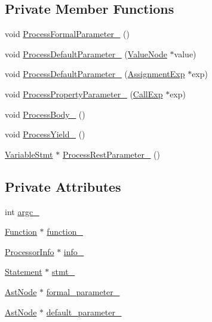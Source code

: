 \subsection*{Private Member Functions}
\begin{DoxyCompactItemize}
\item 
void \hyperlink{classmocha_1_1_function_processor_abf51bbfb82b2118f674091294af28dfa}{ProcessFormalParameter\_\-} ()
\item 
void \hyperlink{classmocha_1_1_function_processor_a3ca564f1c27aac6586fa9876a20c954a}{ProcessDefaultParameter\_\-} (\hyperlink{classmocha_1_1_value_node}{ValueNode} $\ast$value)
\item 
void \hyperlink{classmocha_1_1_function_processor_adfb4453236c5d1880702c41e654cadbc}{ProcessDefaultParameter\_\-} (\hyperlink{classmocha_1_1_assignment_exp}{AssignmentExp} $\ast$exp)
\item 
void \hyperlink{classmocha_1_1_function_processor_aaaecef01492133780ee3d913c3993395}{ProcessPropertyParameter\_\-} (\hyperlink{classmocha_1_1_call_exp}{CallExp} $\ast$exp)
\item 
void \hyperlink{classmocha_1_1_function_processor_aad3b65103cff5f6692654fe79e591bc3}{ProcessBody\_\-} ()
\item 
void \hyperlink{classmocha_1_1_function_processor_a6d6275f740f30823d9989ab10bd5c921}{ProcessYield\_\-} ()
\item 
\hyperlink{classmocha_1_1_variable_stmt}{VariableStmt} $\ast$ \hyperlink{classmocha_1_1_function_processor_a947c36d1350aa2bf1fa13c3f3f90bbd8}{ProcessRestParameter\_\-} ()
\end{DoxyCompactItemize}
\subsection*{Private Attributes}
\begin{DoxyCompactItemize}
\item 
int \hyperlink{classmocha_1_1_function_processor_add1888aa27daa30db055b3ae56835466}{argc\_\-}
\item 
\hyperlink{classmocha_1_1_function}{Function} $\ast$ \hyperlink{classmocha_1_1_function_processor_a6960880e27df165e26343346ffdebd87}{function\_\-}
\item 
\hyperlink{classmocha_1_1_processor_info}{ProcessorInfo} $\ast$ \hyperlink{classmocha_1_1_function_processor_a6f7c00d60191f92a3bdb359c7031eedb}{info\_\-}
\item 
\hyperlink{classmocha_1_1_statement}{Statement} $\ast$ \hyperlink{classmocha_1_1_function_processor_ab5123d2edc85be3e181a79dd7714ba7a}{stmt\_\-}
\item 
\hyperlink{classmocha_1_1_ast_node}{AstNode} $\ast$ \hyperlink{classmocha_1_1_function_processor_a3cd96a2aa4d17c7c34fd5f7efd41ef84}{formal\_\-parameter\_\-}
\item 
\hyperlink{classmocha_1_1_ast_node}{AstNode} $\ast$ \hyperlink{classmocha_1_1_function_processor_a620a370dd5dfc1ce5960856ffbaffb63}{default\_\-parameter\_\-}
\end{DoxyCompactItemize}


